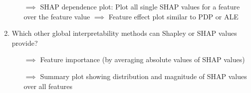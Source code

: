 \begin{enumerate}
    \begin{itemize}
        \item[$\implies$] SHAP dependence plot: Plot all single SHAP values for a feature over the feature value $\implies$ Feature effect plot similar to PDP or ALE
    \end{itemize}
    \item Which other global interpretability methods can Shapley or SHAP values provide?
    \begin{itemize}
        \item[$\implies$] Feature importance (by averaging absolute values of SHAP values)
        \item[$\implies$] Summary plot showing distribution and magnitude of SHAP values over all features
    \end{itemize}
\end{enumerate}
